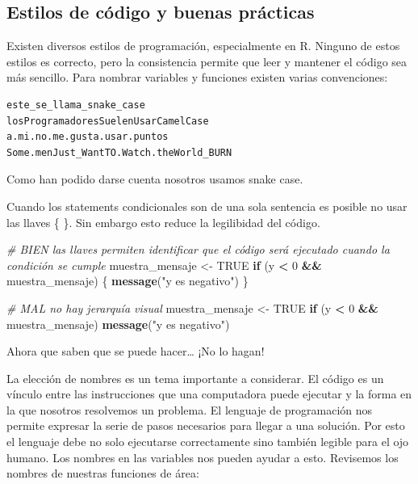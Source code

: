 \documentclass[]{book}
\newenvironment{Shaded}{\begin{snugshade}}{\end{snugshade}}
\newcommand{\KeywordTok}[1]{\textcolor[rgb]{0.13,0.29,0.53}{\textbf{#1}}}
\newcommand{\DecValTok}[1]{\textcolor[rgb]{0.00,0.00,0.81}{#1}}
\newcommand{\StringTok}[1]{\textcolor[rgb]{0.31,0.60,0.02}{#1}}
\newcommand{\CommentTok}[1]{\textcolor[rgb]{0.56,0.35,0.01}{\textit{#1}}}
\newcommand{\OtherTok}[1]{\textcolor[rgb]{0.56,0.35,0.01}{#1}}
\newcommand{\ControlFlowTok}[1]{\textcolor[rgb]{0.13,0.29,0.53}{\textbf{#1}}}
\newcommand{\OperatorTok}[1]{\textcolor[rgb]{0.81,0.36,0.00}{\textbf{#1}}}
\newcommand{\NormalTok}[1]{#1}
\theoremstyle{definition}
\theoremstyle{definition}
\theoremstyle{definition}
\theoremstyle{remark}
\begin{document}
\subsection{Estilos de código y buenas
prácticas}\label{estilos-de-codigo-y-buenas-practicas}

Existen diversos estilos de programación, especialmente en R. Ninguno de
estos estilos es correcto, pero la consistencia permite que leer y
mantener el código sea más sencillo. Para nombrar variables y funciones
existen varias convenciones:

\begin{verbatim}
este_se_llama_snake_case
losProgramadoresSuelenUsarCamelCase
a.mi.no.me.gusta.usar.puntos
Some.menJust_WantTO.Watch.theWorld_BURN
\end{verbatim}

Como han podido darse cuenta nosotros usamos snake case.

Cuando los statements condicionales son de una sola sentencia es posible
no usar las llaves \{ \}. Sin embargo esto reduce la legilibidad del
código.

\begin{Shaded}
\begin{Highlighting}[]
\CommentTok{# BIEN las llaves permiten identificar que el código será ejecutado cuando la condición se cumple}
\NormalTok{muestra_mensaje <-}\StringTok{ }\OtherTok{TRUE}
\ControlFlowTok{if}\NormalTok{ (y }\OperatorTok{<}\StringTok{ }\DecValTok{0} \OperatorTok{&&}\StringTok{ }\NormalTok{muestra_mensaje) \{}
  \KeywordTok{message}\NormalTok{(}\StringTok{"y es negativo"}\NormalTok{)}
\NormalTok{\}}

\CommentTok{# MAL no hay jerarquía visual}
\NormalTok{muestra_mensaje <-}\StringTok{ }\OtherTok{TRUE}
\ControlFlowTok{if}\NormalTok{ (y }\OperatorTok{<}\StringTok{ }\DecValTok{0} \OperatorTok{&&}\StringTok{ }\NormalTok{muestra_mensaje)}
\KeywordTok{message}\NormalTok{(}\StringTok{"y es negativo"}\NormalTok{)}
\end{Highlighting}
\end{Shaded}

Ahora que saben que se puede hacer\ldots{} ¡No lo hagan!

La elección de nombres es un tema importante a considerar. El código es
un vínculo entre las instrucciones que una computadora puede ejecutar y
la forma en la que nosotros resolvemos un problema. El lenguaje de
programación nos permite expresar la serie de pasos necesarios para
llegar a una solución. Por esto el lenguaje debe no solo ejecutarse
correctamente sino también legible para el ojo humano. Los nombres en
las variables nos pueden ayudar a esto. Revisemos los nombres de
nuestras funciones de área:
\end{document}
